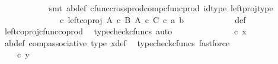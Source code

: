 \begin{isabellebody}
\ \ \ \ \ \ \ \ \ \ \isamarkupfalse%
\ {\isacharparenleft}{\kern0pt}smt\ ab{\isacharunderscore}{\kern0pt}def\ cfunc{\isacharunderscore}{\kern0pt}cross{\isacharunderscore}{\kern0pt}prod{\isacharunderscore}{\kern0pt}comp{\isacharunderscore}{\kern0pt}cfunc{\isacharunderscore}{\kern0pt}prod\ id{\isacharunderscore}{\kern0pt}type\ left{\isacharunderscore}{\kern0pt}proj{\isacharunderscore}{\kern0pt}type{\isacharparenright}{\kern0pt}\isanewline
\ \ \ \ \ \ \ \ \isamarkupfalse%
\ \isamarkupfalse%
\ {\isachardoublequoteopen}{\isachardot}{\kern0pt}{\isachardot}{\kern0pt}{\isachardot}{\kern0pt}\ {\isacharequal}{\kern0pt}\ {\isacharparenleft}{\kern0pt}{\isasymphi}\ {\isasymcirc}\isactrlsub c\ left{\isacharunderscore}{\kern0pt}coproj\ {\isacharparenleft}{\kern0pt}A\ {\isasymtimes}\isactrlsub c\ B{\isacharparenright}{\kern0pt}\ {\isacharparenleft}{\kern0pt}A\ {\isasymtimes}\isactrlsub c\ C{\isacharparenright}{\kern0pt}{\isacharparenright}{\kern0pt}\ {\isasymcirc}\isactrlsub c\ {\isasymlangle}a{\isacharcomma}{\kern0pt}\ b{\isasymrangle}{\isachardoublequoteclose}\isanewline
\ \ \ \ \ \ \ \ \ \ \isamarkupfalse%
\ {\isasymphi}{\isacharunderscore}{\kern0pt}def\ \isamarkupfalse%
\ left{\isacharunderscore}{\kern0pt}coproj{\isacharunderscore}{\kern0pt}cfunc{\isacharunderscore}{\kern0pt}coprod\ \isamarkupfalse%
\ {\isacharparenleft}{\kern0pt}typecheck{\isacharunderscore}{\kern0pt}cfuncs{\isacharcomma}{\kern0pt}\ auto{\isacharparenright}{\kern0pt}\isanewline
\ \ \ \ \ \ \ \ \isamarkupfalse%
\ \isamarkupfalse%
\ {\isachardoublequoteopen}{\isachardot}{\kern0pt}{\isachardot}{\kern0pt}{\isachardot}{\kern0pt}\ {\isacharequal}{\kern0pt}\ {\isasymphi}\ {\isasymcirc}\isactrlsub c\ x{\isachardoublequoteclose}\isanewline
\ \ \ \ \ \ \ \ \ \ \isamarkupfalse%
\ ab{\isacharunderscore}{\kern0pt}def\ comp{\isacharunderscore}{\kern0pt}associative{}\ {\isasymphi}{\isacharunderscore}{\kern0pt}type\ x{\isacharprime}{\kern0pt}{\isacharunderscore}{\kern0pt}def\ \isamarkupfalse%
\ {\isacharparenleft}{\kern0pt}typecheck{\isacharunderscore}{\kern0pt}cfuncs{\isacharcomma}{\kern0pt}\ fastforce{\isacharparenright}{\kern0pt}\isanewline
\ \ \ \ \ \ \ \ \isamarkupfalse%
\ \isamarkupfalse%
\ {\isachardoublequoteopen}{\isachardot}{\kern0pt}{\isachardot}{\kern0pt}{\isachardot}{\kern0pt}\ {\isacharequal}{\kern0pt}\ {\isasymphi}\ {\isasymcirc}\isactrlsub c\ y{\isachardoublequoteclose}\isanewline
\ \ \ \ \ \ \ \ \ \ \isamarkupfalse%

\end{isabellebody}
